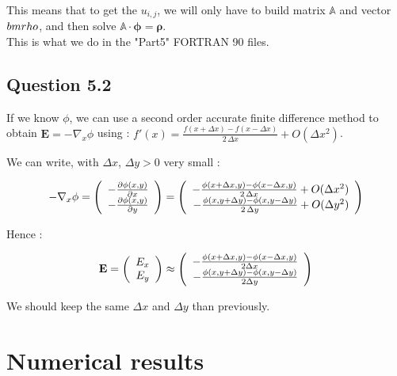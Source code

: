 \documentclass[10pt]{article}
\begin{document}
This means that to get the $u_{i,j}$, we will only have to build matrix $\mathbb{A}$ and vector $\\bm{rho}$, and then solve $\mathbb{A}\cdot \bm{\phi} = \bm{\rho}$.\\

This is what we do in the "Part5" FORTRAN 90 files.



\subsection{Question 5.2}


If we know $\phi$, we can use a second order accurate finite difference method to obtain $\textbf{E} = - \nabla_x \phi$ using : $ f'(x) = \frac {f (x + \Delta x) - f (x - \Delta x) }{2\, \Delta x} + O (\Delta x^2)$.
 
We can write, with $\Delta x$, $\Delta y > 0$ very small :

$$-\nabla_x \phi = \left(
\begin{array}{c c c}
      -\frac {\partial \phi (x,y)}{\partial x}\\
      -\frac {\partial \phi (x,y)}{\partial y}
 \end{array} \right) = \left(
\begin{array}{r c l}
      -\frac {\phi (x + \Delta x,y) - \phi (x - \Delta x,y) }{2\, \Delta x} + O (\Delta x^2)\\
      -\frac {\phi (x,y + \Delta y) - \phi (x,y - \Delta y) }{2\, \Delta y} + O (\Delta y^2)
 \end{array} \right) $$

Hence :

$$ \textbf{E} = \left(
\begin{array}{r c l}
      E_x\\
      E_y
 \end{array} \right) \approx \left(
\begin{array}{r c l}
      -\frac {\phi (x + \Delta x,y) - \phi (x - \Delta x,y) }{2 \Delta x}\\
      -\frac {\phi (x,y + \Delta y) - \phi (x,y - \Delta y) }{2 \Delta y}
 \end{array} \right) $$
 
We should keep the same $\Delta x$ and $\Delta y$ than previously.


\newpage

\section{Numerical results}
\end{document}
